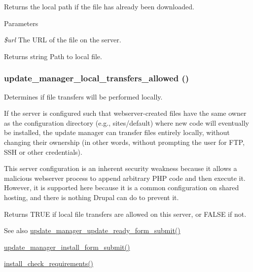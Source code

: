 Returns the local path if the file has already been downloaded.


\begin{DoxyParams}{Parameters}
\item[{\em \$url}]The URL of the file on the server.\end{DoxyParams}
\begin{DoxyReturn}{Returns}
string Path to local file. 
\end{DoxyReturn}
\hypertarget{group__update__manager__file_ga88ed61885931bd3df617ca78b4fadb6c}{
\subsubsection[{update\_\-manager\_\-local\_\-transfers\_\-allowed}]{\setlength{\rightskip}{0pt plus 5cm}update\_\-manager\_\-local\_\-transfers\_\-allowed ()}}
\label{group__update__manager__file_ga88ed61885931bd3df617ca78b4fadb6c}
Determines if file transfers will be performed locally.

If the server is configured such that webserver-\/created files have the same owner as the configuration directory (e.g., sites/default) where new code will eventually be installed, the update manager can transfer files entirely locally, without changing their ownership (in other words, without prompting the user for FTP, SSH or other credentials).

This server configuration is an inherent security weakness because it allows a malicious webserver process to append arbitrary PHP code and then execute it. However, it is supported here because it is a common configuration on shared hosting, and there is nothing Drupal can do to prevent it.

\begin{DoxyReturn}{Returns}
TRUE if local file transfers are allowed on this server, or FALSE if not.
\end{DoxyReturn}
\begin{DoxySeeAlso}{See also}
\hyperlink{group__update__manager__update_gaeab4690bf95cb0d0b517a0b9161e5045}{update\_\-manager\_\-update\_\-ready\_\-form\_\-submit()} 

\hyperlink{group__update__manager__install_ga52e9f2cddddddccf921284b01f9505b0}{update\_\-manager\_\-install\_\-form\_\-submit()} 

\hyperlink{install_8core_8inc_ae9175b59627ec291ef76fd241f74f33e}{install\_\-check\_\-requirements()} 
\end{DoxySeeAlso}
